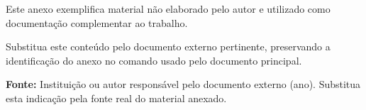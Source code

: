 \label{an:exemplo-a}

Este anexo exemplifica material não elaborado pelo autor e utilizado como documentação complementar ao trabalho.

Substitua este conteúdo pelo documento externo pertinente, preservando a identificação do anexo no comando \texttt{\string\annex} usado pelo documento principal.

\noindent\textbf{Fonte:} Instituição ou autor responsável pelo documento externo (ano). Substitua esta indicação pela fonte real do material anexado.
